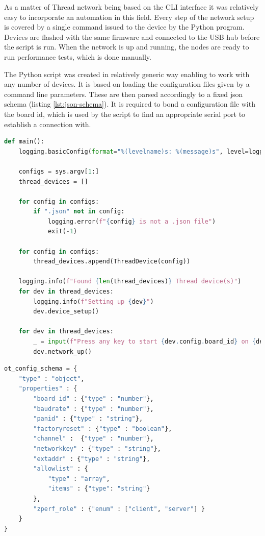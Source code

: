 As a matter of Thread network being based on the CLI interface it was 
relatively easy to incorporate an automation in this field. Every step of 
the network setup is covered by a single command issued to the device by the
Python program. Devices are flashed with the same firmware and connected to
the USB hub before the script is run. When the network is up and running,
the nodes are ready to run performance tests, which is done manually.

The Python script was created in relatively generic way enabling to work with
any number of devices. It is based on loading the configuration files
given by a command line parameters. These are then parsed accordingly to a fixed
json schema (listing \ref{lst:json-schema}). It is required to bond a 
configuration file with the board id, which is used by the script to find an 
appropriate serial port to establish a connection with.

\medskip
\begin{lstlisting}[language=Python, label={lst:thread-automation-script}, caption={The main function of a script for Thread network setup}]
def main():
    logging.basicConfig(format="%(levelname)s: %(message)s", level=logging.DEBUG)

    configs = sys.argv[1:]
    thread_devices = []

    for config in configs:
        if ".json" not in config:
            logging.error(f"{config} is not a .json file")
            exit(-1)

    for config in configs:
        thread_devices.append(ThreadDevice(config))

    logging.info(f"Found {len(thread_devices)} Thread device(s)")
    for dev in thread_devices:
        logging.info(f"Setting up {dev}")
        dev.device_setup()

    for dev in thread_devices:
        _ = input(f"Press any key to start {dev.config.board_id} on {dev._find_tty()}")
        dev.network_up()
\end{lstlisting}

\medskip
\begin{lstlisting}[language=Python, label={lst:json-schema}, caption={The json 
schema used to parse boards configuration files.}]
ot_config_schema = {
    "type" : "object",
    "properties" : {
        "board_id" : {"type" : "number"},
        "baudrate" : {"type" : "number"},
        "panid" : {"type" : "string"},
        "factoryreset" : {"type" : "boolean"},
        "channel" :  {"type" : "number"},
        "networkkey" : {"type" : "string"},
        "extaddr" : {"type" : "string"},
        "allowlist" : {
            "type" : "array",
            "items" : {"type": "string"}
        },
        "zperf_role" : {"enum" : ["client", "server"] }
    }
}
\end{lstlisting}

